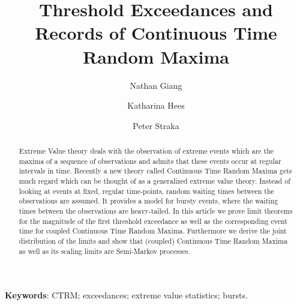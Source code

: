 \documentclass[12pt, a4paper]{article}
\title{Threshold Exceedances and Records of Continuous Time Random Maxima}
\author{Nathan Giang \and Katharina Hees \and Peter Straka}
\newcommand{\1}{\mathbf 1}
\begin{document}
\maketitle

\begin{abstract}
Extreme Value theory deals with the observation of extreme events which are the maxima of a sequence of observations and admits that these events occur at regular intervals in time. Recently a new theory called Continuous Time Random Maxima gets much regard which can be thought of as a generalized extreme value theory. Instead of looking at events at fixed, regular time-points, random waiting times between the observations are assumed. It provides a model for bursty events, where the waiting times between the observations are heavy-tailed. In this article we prove limit theorems for the magnitude of the first threshold exceedance as well as the corresponding event time for coupled Continuous Time Random Maxima. Furthermore we derive the joint distribution of the limits and show that (coupled) Continuous Time Random Maxima as well as its scaling limits are Semi-Markov processes. 

\end{abstract}

{\bf Keywords}: CTRM; exceedances; extreme value statistics; bursts.


\setlength{\parindent}{0pt}
\end{document}
